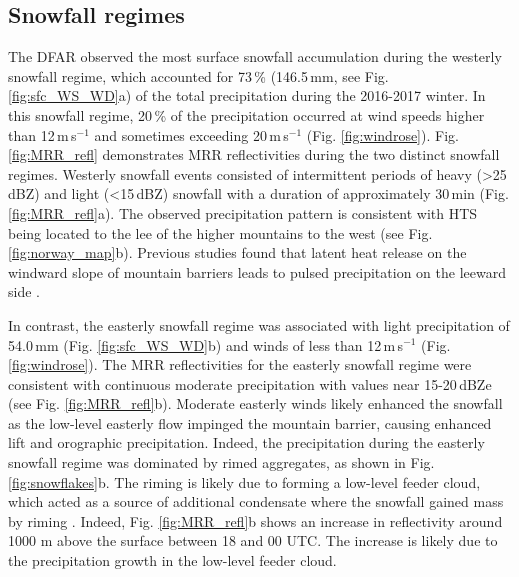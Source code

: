 \documentclass{ametsocV5}
\begin{document}
	\subsection{Snowfall regimes}\label{sec:res:snowfall_regimes}
		The DFAR observed the most surface snowfall accumulation during the westerly snowfall regime, which accounted for 73\,\% (146.5\,mm, see Fig. \ref{fig:sfc_WS_WD}a) of the total precipitation during the 2016-2017 winter. In this snowfall regime, 20\,\% of the precipitation occurred at wind speeds higher than 12\,m\,s$^{-1}$ and sometimes exceeding 20\,m\,s$^{-1}$ (Fig. \ref{fig:windrose}). Fig. \ref{fig:MRR_refl} demonstrates MRR reflectivities during the two distinct snowfall regimes. Westerly snowfall events consisted of intermittent periods of heavy (\textgreater 25\,dBZ) and light (\textless 15\,dBZ) snowfall with a duration of approximately 30\,min (Fig. \ref{fig:MRR_refl}a). The observed precipitation pattern is consistent with HTS being located to the lee of the higher mountains to the west (see Fig. \ref{fig:norway_map}b). Previous studies found that latent heat release on the windward slope of mountain barriers leads to pulsed precipitation on the leeward side \citep{sinclair_factors_1997,kaplan_role_2009}. 

		In contrast, the easterly snowfall regime was associated with light precipitation of 54.0\,mm (Fig. \ref{fig:sfc_WS_WD}b) and  winds of less than  12\,m\,s$^{-1}$ (Fig. \ref{fig:windrose}). The MRR reflectivities for the easterly snowfall regime were consistent with continuous moderate precipitation with values near 15-20\,dBZe (see Fig. \ref{fig:MRR_refl}b). Moderate easterly winds likely enhanced the snowfall as the low-level easterly flow impinged the mountain barrier, causing enhanced lift and orographic precipitation. Indeed, the precipitation during the easterly snowfall regime was dominated by rimed aggregates, as shown in Fig. \ref{fig:snowflakes}b. The riming is likely due to forming a low-level feeder cloud, which acted as a source of additional condensate where the snowfall gained mass by riming \citep{borys_mountaintop_2003,lowenthal_isotopic_2016}. Indeed, Fig. \ref{fig:MRR_refl}b shows an increase in reflectivity around 1000 m above the surface between 18 and 00 UTC. The increase is likely due to the precipitation growth in the low-level feeder cloud.
\end{document}

